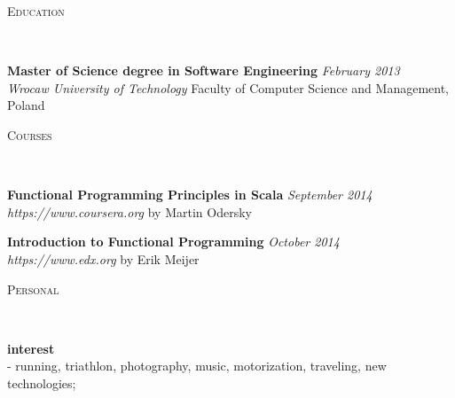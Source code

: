 \documentclass[9pt]{article}
\newenvironment{changemargin}[2]{%
  \begin{list}{}{%
      \setlength{\topsep}{0pt}%
      \setlength{\leftmargin}{#1}%
      \setlength{\rightmargin}{#2}%
      \setlength{\listparindent}{\parindent}%
      \setlength{\itemindent}{\parindent}%
      \setlength{\parsep}{\parskip}%
    }%
  \item[]}{\end{list}
}
\newcommand{\lineover}{
  \begin{changemargin}{-0.05in}{-0.05in}
    \vspace*{-8pt}
    \hrulefill \\
    \vspace*{-2pt}
  \end{changemargin}
}
\newcommand{\header}[1]{
	\begin{changemargin}{-0.5in}{-0.5in}
		\scshape{#1}\\
  	\lineover
	\end{changemargin}
}
\newenvironment{body} {
	\vspace*{-16pt}
	\begin{changemargin}{-0.25in}{-0.5in}
  }
	{\end{changemargin}
}
\begin{document}
\header{Education}

\begin{body}
  \vspace{14pt}
  \textbf{Master of Science degree in Software Engineering}{} \hfill \emph{February 2013}{} \\
  \emph{Wrocaw University of Technology} Faculty of Computer Science and Management, Poland{} \\
\end{body}

\medskip


\header{Courses}

\begin{body}
  \vspace{14pt}
  \textbf{Functional Programming Principles in Scala}{} \hfill \emph{September 2014}{} \\
  \emph{https://www.coursera.org} by Martin Odersky{} \\
  \medskip

  \textbf{Introduction to Functional Programming}{} \hfill \emph{October 2014}{} \\
  \emph{https://www.edx.org} by Erik Meijer{} \\
\end{body}
\medskip


\header{Personal}

\begin{body}
  \vspace{14pt}
  \textbf{interest}{} \hfill {} \\
  - running, triathlon, photography, music, motorization, traveling, new technologies; \hfill {} \\
\end{body}
\medskip
\end{document}
